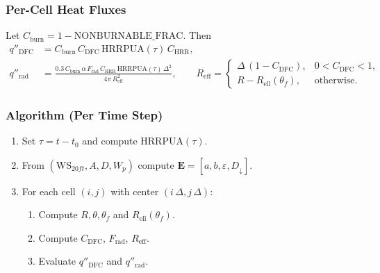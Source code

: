 \documentclass[../report/case_report.tex]{subfiles}
\begin{document}
\subsubsection*{Per-Cell Heat Fluxes}
Let $C_{\mathrm{burn}}=1-\mathrm{NONBURNABLE\_FRAC}$. Then
\begin{align}
  q''_{\mathrm{DFC}} &= C_{\mathrm{burn}}\,C_{\mathrm{DFC}}\,\mathrm{HRRPUA}(\tau)\,C_\mathrm{HRR},\\
  q''_{\mathrm{rad}} &= \frac{0.3\,C_{\mathrm{burn}}\,\alpha\,F_{\mathrm{rad}}\,C_\mathrm{HRR}\,\mathrm{HRRPUA}(\tau)\,\Delta^2}{4\pi\,R_{\mathrm{eff}}^2},\qquad
  R_{\mathrm{eff}}=\begin{cases}
  \Delta\,(1-C_{\mathrm{DFC}}), & 0<C_{\mathrm{DFC}}<1,\\
  R- R_{\mathrm{ell}}(\theta_f), & \text{otherwise}.
  \end{cases}
\end{align}

\subsubsection*{Algorithm (Per Time Step)}
\begin{enumerate}[nosep,label=\arabic*.]
  \item Set $\tau=t-t_0$ and compute $\mathrm{HRRPUA}(\tau)$.
  \item From $(\mathrm{WS}_{20ft},A,D,W_p)$ compute $\mathbf{E}=[a,b,\varepsilon,D_\downarrow]$.
  \item For each cell $(i,j)$ with center $(i\,\Delta,j\,\Delta)$:
  \begin{enumerate}[nosep,label*=\arabic*.]
    \item Compute $R,\theta,\theta_f$ and $R_{\mathrm{ell}}(\theta_f)$.
    \item Compute $C_{\mathrm{DFC}}$, $F_{\mathrm{rad}}$, $R_{\mathrm{eff}}$.
    \item Evaluate $q''_{\mathrm{DFC}}$ and $q''_{\mathrm{rad}}$.
  \end{enumerate}
\end{enumerate}
\end{document}
